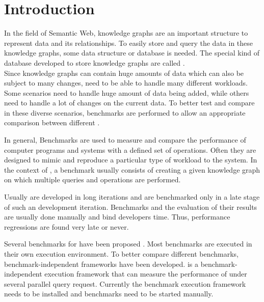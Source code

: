 \chapter{Introduction}
\label{ch:introduction}




In the field of Semantic Web, knowledge graphs are an important structure to represent data and its relationships.
To easily store and query the data in these knowledge graphs, some data structure or database is needed.
The special kind of database developed to store knowledge graphs are called \tsp{}. \\

Since knowledge graphs can contain huge amounts of data which can also be subject to many changes, \tsp{} need to be able to handle many different workloads.
Some scenarios need to handle huge amount of data being added, while others need to handle a lot of changes on the current data.
To better test and compare \tsp{} in these diverse scenarios, benchmarks are performed to allow an appropriate comparison between different \tsp{}\cite{saleemHowRepresentativeSPARQL2019}.

In general, Benchmarks are used to measure and compare the performance of computer programs and systems with a defined set of operations.
Often they are designed to mimic and reproduce a particular type of workload to the system.
In the context of \tsp{}, a benchmark usually consists of creating a given knowledge graph on which multiple queries and operations are performed.

Usually \tsp{} are developed in long iterations and are benchmarked only in a late stage of such an development iteration.
Benchmarks and the evaluation of their results are usually done manually and bind developers time.
Thus, performance regressions are  found very late or never.


Several benchmarks for \tsp{} have been proposed \cite{saleemHowRepresentativeSPARQL2019}.
Most benchmarks are executed in their own execution environment.
To better compare different benchmarks, benchmark-independent frameworks have been developed.
\iguana{} is a benchmark-independent execution framework \cite{conradsIguanaGenericFramework2017} that can measure the performance of \tsp{} under several parallel query request.
Currently the benchmark execution framework needs to be installed and benchmarks need to be started manually.

